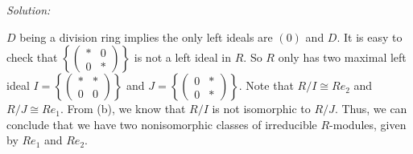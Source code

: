 \documentclass[a4paper, 12pt]{article}
\newenvironment{solution}
    {\textit{Solution:}}
    {}
\begin{document}
\begin{solution}
\begin{enumerate}[(1)]
\(D\) being a division ring implies the only left ideals are \((0)\) and \(D\). It is easy to check that \(\left\{ \begin{pmatrix}
*&0\\ 
0&*
\end{pmatrix} \right\}\) is not a left ideal in \(R\). So \(R\) only has two maximal left ideal \(I=\left\{ \begin{pmatrix}
    *&*\\ 
    0&0
\end{pmatrix} \right\}\) and \(J=\left\{ \begin{pmatrix}
    0&*\\ 
    0&*
\end{pmatrix} \right\}\). Note that \(R/I\cong Re_2\) and \(R/J\cong Re_1\). From (b), we know that \(R/I\) is not isomorphic to \(R/J\). Thus, we can 
conclude that we have two nonisomorphic classes of irreducible \(R\)-modules, given by \(Re_1\) and \(Re_2\).
\end{enumerate}
\end{solution}
\end{document}
